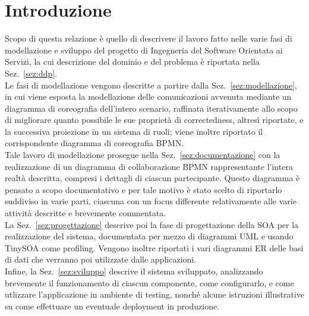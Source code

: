 \documentclass[11pt]{article} %
\begin{document}
\clearpage
\tableofcontents
\thispagestyle{empty}
\newpage

\section{Introduzione}

Scopo di questa relazione è quello di descrivere il lavoro fatto nelle varie fasi di modellazione e sviluppo del progetto di Ingegneria del Software Orientata ai Servizi, la cui descrizione del dominio e del problema è riportata nella Sez.~\ref{sez:ddp}.\\
Le fasi di modellazione vengono descritte a partire dalla Sez.~\ref{sez:modellazione}, in cui viene esposta la modellazione delle comunicazioni avvenuta mediante un diagramma di coreografia dell'intero scenario, raffinata iterativamente allo scopo di migliorare quanto possibile le sue proprietà di correctedness, altresì riportate, e la successiva proiezione in un sistema di ruoli; viene inoltre riportato il corrispondente diagramma di coreografia BPMN.\\
Tale lavoro di modellazione prosegue nella Sez.~\ref{sez:documentazione} con la realizzazione di un diagramma di collaborazione BPMN rappresentante l'intera realtà descritta, compresi i dettagli di ciascun partecipante. Questo diagramma è pensato a scopo documentativo e per tale motivo è stato scelto di riportarlo suddiviso in varie parti, ciascuna con un focus differente relativamente alle varie attività descritte e brevemente commentata.\\
La Sez.~\ref{sez:progettazione} descrive poi la fase di progettazione della SOA per la realizzazione del sistema, documentata per mezzo di diagrammi UML e usando TinySOA come profiling. Vengono inoltre riportati i vari diagrammi ER delle basi di dati che verranno poi utilizzate dalle applicazioni.\\
Infine, la Sez.~\ref{sez:sviluppo} descrive il sistema sviluppato, analizzando brevemente il funzionamento di ciascun componente, come configurarlo, e come utlizzare l'applicazione in ambiente di testing, nonché alcune istruzioni illustrative su come effettuare un eventuale deployment in produzione.

\clearpage
\end{document}
